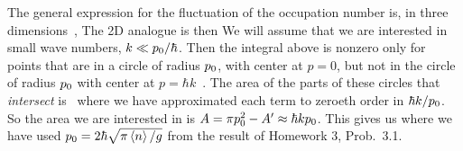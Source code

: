 \documentclass[11pt]{article}
\begin{document}
{	The general expression for the fluctuation of the occupation number is, in three dimensions~\cite[p.~356]{Landau2},
	The 2D analogue is then
	We will assume that we are interested in small wave numbers, $k \ll p_0 / \hbar$.  Then the integral above is nonzero only for points that are in a circle of radius $p_0$, with center at $p = 0$, but not in the circle of radius $p_0$ with center at $p = \hbar k$~\cite[p.~357]{Landau}.  The area of the parts of these circles that \emph{intersect} is~\cite{Intersection}
	where we have approximated each term to zeroeth order in $\hbar k / p_0$.  So the area we are interested in is $A = \pi p_0^2 - A' \approx \hbar k p_0$.  This gives us
	where we have used $\po = 2\hbar \sqrt{\pi \evn / g}$ from the result of Homework 3, Prob.~{3.1}.
%	
}


%
%

\end{document}
